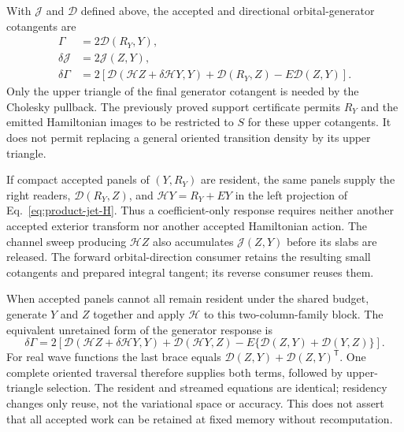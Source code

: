 \documentclass[11pt,a4paper]{article}
\newcommand{\Tr}{^{\mathsf T}}
\newcommand{\Ha}{\mathcal H}
\begin{document}
With $\mathcal J$ and $\mathcal D$ defined above, the accepted and
directional orbital-generator cotangents are
\begin{align}
 \Gamma&=2\mathcal D(R_Y,Y),\\
 \delta\mathcal J&=2\mathcal J(Z,Y),\\
 \delta\Gamma&=2\left[
   \mathcal D(\Ha Z+\delta\Ha Y,Y)
   +\mathcal D(R_Y,Z)-E\mathcal D(Z,Y)\right].
 \label{eq:product-jet-generator}
\end{align}
Only the upper triangle of the final generator cotangent is needed by
the Cholesky pullback. The previously proved support certificate permits
$R_Y$ and the emitted Hamiltonian images to be restricted to $S$ for these
upper cotangents. It does not permit replacing a general oriented transition
density by its upper triangle.

If compact accepted panels of $(Y,R_Y)$ are resident, the same panels supply
the right readers, $\mathcal D(R_Y,Z)$, and
$\Ha Y=R_Y+EY$ in the left projection of
Eq.~\eqref{eq:product-jet-H}. Thus a coefficient-only response
requires neither another accepted exterior transform nor another accepted
Hamiltonian action. The channel sweep producing $\Ha Z$ also accumulates
$\mathcal J(Z,Y)$ before its slabs are released.
The forward orbital-direction consumer retains the resulting small
cotangents and prepared integral tangent; its reverse consumer reuses them.

When accepted panels cannot all remain resident under the shared budget,
generate $Y$ and $Z$ together and apply $\Ha$ to this two-column-family
block. The equivalent unretained form of the generator response is
\begin{equation}
 \delta\Gamma=2\left[
 \mathcal D(\Ha Z+\delta\Ha Y,Y)+\mathcal D(\Ha Y,Z)
 -E\{\mathcal D(Z,Y)+\mathcal D(Y,Z)\}\right].
\end{equation}
For real wave functions the last brace equals
$\mathcal D(Z,Y)+\mathcal D(Z,Y)\Tr$. One complete oriented traversal
therefore supplies both terms, followed by upper-triangle selection.
The resident and streamed equations are identical; residency changes only
reuse, not the variational space or accuracy. This does not assert that
all accepted work can be retained at fixed memory without recomputation.
\end{document}
